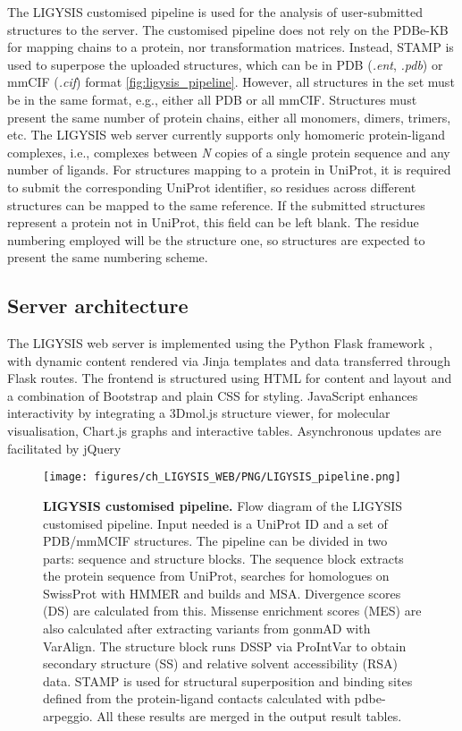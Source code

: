 The LIGYSIS customised pipeline is used for the analysis of user-submitted structures to the server. The customised pipeline does not rely on the PDBe-KB for mapping chains to a protein, nor transformation matrices. Instead, STAMP \cite{RUSSELL_1992_STAMP} is used to superpose the uploaded structures, which can be in PDB (\textit{.ent}, \textit{.pdb}) or mmCIF (\textit{.cif}) format \autoref{fig:ligysis_pipeline}. However, all structures in the set must be in the same format, e.g., either all PDB or all mmCIF. Structures must present the same number of protein chains, either all monomers, dimers, trimers, etc. The LIGYSIS web server currently supports only homomeric protein-ligand complexes, i.e., complexes between \textit{N} copies of a single protein sequence and any number of ligands. For structures mapping to a protein in UniProt, it is required to submit the corresponding UniProt identifier, so residues across different structures can be mapped to the same reference. If the submitted structures represent a protein not in UniProt, this field can be left blank. The residue numbering employed will be the structure one, so structures are expected to present the same numbering scheme.

\subsection{Server architecture}

The LIGYSIS web server is implemented using the Python Flask framework \cite{GRINBERG_2018_FLASK}, with dynamic content rendered via Jinja \cite{JINJA} templates and data transferred through Flask routes. The frontend is structured using HTML for content and layout and a combination of Bootstrap \cite{BOOTSTRAP} and plain CSS \cite{HTML_CSS} for styling. JavaScript \cite{JAVASCRIPT} enhances interactivity by integrating a 3Dmol.js \cite{REGO_2014_3DMOL, SESHADRI_2020_3DMOL} structure viewer, for molecular visualisation, Chart.js \cite{CHARTJS} graphs and interactive tables. Asynchronous updates are facilitated by jQuery \cite{jQUERY}

\begin{figure}[htbp!]
    \centering
    \texttt{[image: figures/ch\_LIGYSIS\_WEB/PNG/LIGYSIS\_pipeline.png]}
    \caption[LIGYSIS customised pipeline]{\textbf{LIGYSIS customised pipeline.} Flow diagram of the LIGYSIS customised pipeline. Input needed is a UniProt ID and a set of PDB/mmMCIF structures. The pipeline can be divided in two parts: sequence and structure blocks. The sequence block extracts the protein sequence from UniProt, searches for homologues on SwissProt with HMMER and builds and MSA. Divergence scores (DS) are calculated from this. Missense enrichment scores (MES) are also calculated after extracting variants from gonmAD with VarAlign. The structure block runs DSSP via ProIntVar to obtain secondary structure (SS) and relative solvent accessibility (RSA) data. STAMP is used for structural superposition and binding sites defined from the protein-ligand contacts calculated with pdbe-arpeggio. All these results are merged in the output result tables.}
    \label{fig:ligysis_pipeline}
\end{figure}

